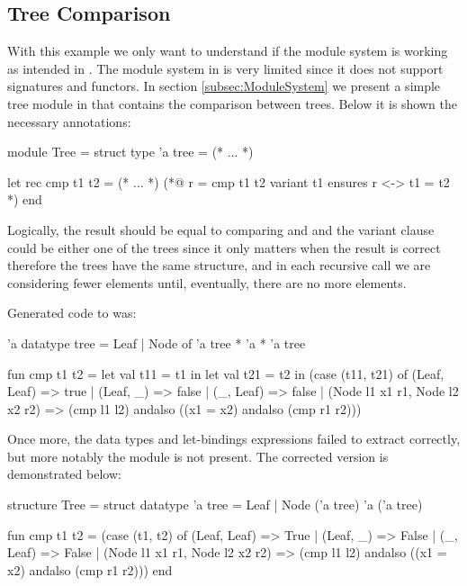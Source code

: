 \subsection{Tree Comparison}

With this example we only want to understand if the module system is working as intended in \cml. The module system in \cml is very 
limited since it does not support signatures and functors. In section \ref{subsec:ModuleSystem} we present a simple tree module in \ocaml that 
contains the comparison between trees. Below it is shown the necessary \gospel annotations:

\begin{gospell}
module Tree = struct
  type 'a tree = (* ... *)

  let rec cmp t1 t2 = (* ... *)
  (*@
  r = cmp t1 t2
  variant t1
  ensures r <-> t1 = t2
  *)
end
\end{gospell}

Logically, the result should be equal to comparing  and  and the variant clause could be either one of 
the trees since it only matters when the result is correct therefore the trees have the same structure, and in each recursive call we
are considering fewer elements until, eventually, there are no more elements.

Generated code to \cml was:

\begin{cakeml}
'a datatype tree = Leaf | Node of 'a tree * 'a * 'a tree

fun cmp t1 t2 = let val t11 = t1 in
  let val t21 = t2 in
  (case (t11, t21) of
    (Leaf, Leaf) => true
  | (Leaf, _) => false
  | (_, Leaf) => false
  | (Node l1 x1 r1, Node l2 x2 r2) =>
    (cmp l1 l2) andalso ((x1 = x2) andalso (cmp r1 r2)))
\end{cakeml}

Once more, the data types and let-bindings expressions failed to extract correctly, but more notably the module is not present.
The corrected version is demonstrated below:

\begin{cakeml}
structure Tree = struct
  datatype 'a tree = Leaf | Node ('a tree) 'a ('a tree)

  fun cmp t1 t2 =
  (case (t1, t2) of
    (Leaf, Leaf) => True
  | (Leaf, _) => False
  | (_, Leaf) => False
  | (Node l1 x1 r1, Node l2 x2 r2) =>
      (cmp l1 l2) andalso ((x1 = x2) andalso (cmp r1 r2)))
end
\end{cakeml}

